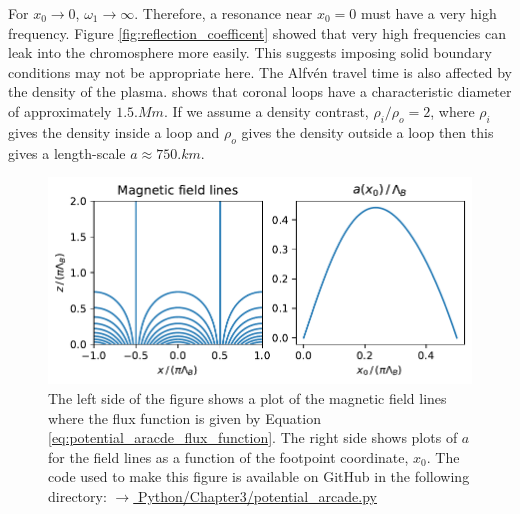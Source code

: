 For $x_0\rightarrow0$, $\omega_1\rightarrow\infty$. Therefore, a resonance near $x_0=0$ must have a very high frequency. Figure \ref{fig:reflection_coefficent} showed that very high frequencies can leak into the chromosphere more easily. This suggests imposing solid boundary conditions may not be appropriate here.
The Alfv\'en travel time is also affected by the density of the plasma. \citet{Klimchuk2015} shows that coronal loops have a characteristic diameter of approximately $1.5\si{.Mm}$. If we assume a density contrast, $\rho_i/\rho_o=2$, \citep{Hood2013,Pascoe2013} where $\rho_i$ gives the density inside a loop and $\rho_o$ gives the density outside a loop then this gives a length-scale $a\approx750\si{.km}$.

\begin{figure}
    \centering
    \vspace{-20pt}
    \includegraphics[width=\textwidth,height=0.8\textheight,keepaspectratio]{figures/chapter03/potential_arcade.pdf}
    \vspace{-30pt}
    \caption{The left side of the figure shows a plot of the magnetic field lines where the flux function is given by Equation \eqref{eq:potential_aracde_flux_function}. The right side shows plots of $a$ for the field lines as a function of the footpoint coordinate, $x_0$. The code used to make this figure is available on GitHub in the following directory:\newline
    \href{https://github.com/aleksyprok/apkp_thesis/blob/main/Python/Chapter3/potential_arcade.py}{$\rightarrow$ Python/Chapter3/potential\_arcade.py}}
    \vspace{-10pt}
    \label{fig:potential_arcade}
\end{figure}

